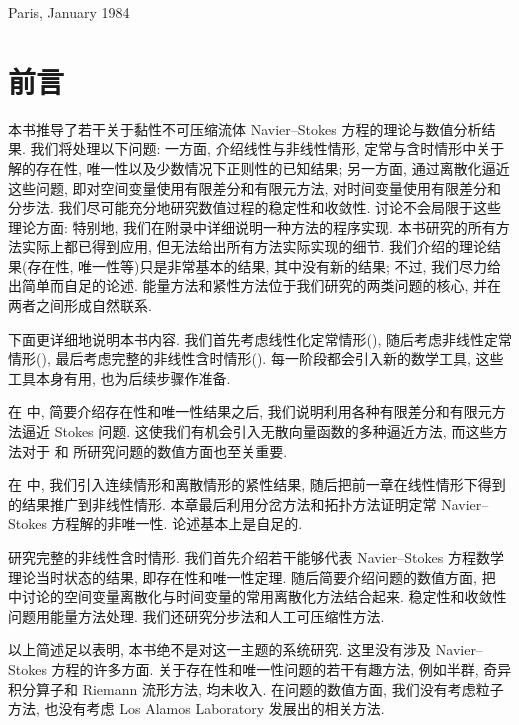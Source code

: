 \begin{flushright}
Paris, January 1984
\end{flushright}

\clearpage
\section*{前言}
\label{front:foreword}

本书推导了若干关于黏性不可压缩流体 Navier--Stokes 方程的理论与数值分析结果. 我们将处理以下问题: 一方面, 介绍线性与非线性情形, 定常与含时情形中关于解的存在性, 唯一性以及少数情况下正则性的已知结果; 另一方面, 通过离散化逼近这些问题, 即对空间变量使用有限差分和有限元方法, 对时间变量使用有限差分和分步法. 我们尽可能充分地研究数值过程的稳定性和收敛性. 讨论不会局限于这些理论方面: 特别地, 我们在附录中详细说明一种方法的程序实现. 本书研究的所有方法实际上都已得到应用, 但无法给出所有方法实际实现的细节. 我们介绍的理论结果(存在性, 唯一性等)只是非常基本的结果, 其中没有新的结果; 不过, 我们尽力给出简单而自足的论述. 能量方法和紧性方法位于我们研究的两类问题的核心, 并在两者之间形成自然联系.

下面更详细地说明本书内容. 我们首先考虑线性化定常情形(), 随后考虑非线性定常情形(), 最后考虑完整的非线性含时情形(). 每一阶段都会引入新的数学工具, 这些工具本身有用, 也为后续步骤作准备.

在  中, 简要介绍存在性和唯一性结果之后, 我们说明利用各种有限差分和有限元方法逼近 Stokes 问题. 这使我们有机会引入无散向量函数的多种逼近方法, 而这些方法对于  和  所研究问题的数值方面也至关重要.

在  中, 我们引入连续情形和离散情形的紧性结果, 随后把前一章在线性情形下得到的结果推广到非线性情形. 本章最后利用分岔方法和拓扑方法证明定常 Navier--Stokes 方程解的非唯一性. 论述基本上是自足的.

 研究完整的非线性含时情形. 我们首先介绍若干能够代表 Navier--Stokes 方程数学理论当时状态的结果, 即存在性和唯一性定理. 随后简要介绍问题的数值方面, 把  中讨论的空间变量离散化与时间变量的常用离散化方法结合起来. 稳定性和收敛性问题用能量方法处理. 我们还研究分步法和人工可压缩性方法.

以上简述足以表明, 本书绝不是对这一主题的系统研究. 这里没有涉及 Navier--Stokes 方程的许多方面. 关于存在性和唯一性问题的若干有趣方法, 例如半群, 奇异积分算子和 Riemann 流形方法, 均未收入. 在问题的数值方面, 我们没有考虑粒子方法, 也没有考虑 Los Alamos Laboratory 发展出的相关方法.

